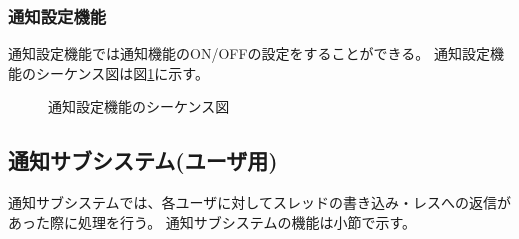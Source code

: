\documentclass[a4j]{jarticle}
\begin{document}
  \subsubsection{通知設定機能}
  通知設定機能では通知機能のON/OFFの設定をすることができる。
  通知設定機能のシーケンス図は図\ref{fig:mypage_notice.png}に示す。
  \begin{figure}[H]
    \centering
    \caption{通知設定機能のシーケンス図}
    \label{fig:mypage_notice.png}
  \end{figure}


  \subsection{通知サブシステム(ユーザ用)}
  通知サブシステムでは、各ユーザに対してスレッドの書き込み・レスへの返信があった際に処理を行う。
  通知サブシステムの機能は小節で示す。
\end{document}
